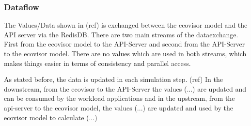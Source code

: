 \subsubsection{Dataflow}
\label{subsec:dataflow}

The Values/Data shown in (ref) is exchanged between the ecovisor model and the API server via the RedisDB. There are two main streams of the dataexchange.
First from the ecovisor model to the API-Server and second from the API-Server to the ecovisor model. There are no values which are used in both streams, which makes things
easier in terms of consistency and parallel access.

As stated before, the data is updated in each simulation step. (ref)
In the downstream, from the ecovisor to the API-Server the values (...) are updated and can be consumed by the workload applications
and in the upstream, from the api-server to the ecovisor model, the values (...) are updated and used by the ecovisor model to calculate (...) %

